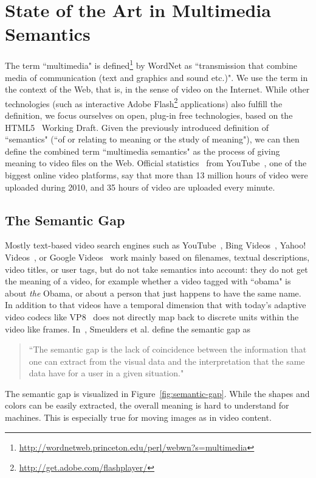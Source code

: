\documentclass[12pt]{article}
\begin{document}
\section{State of the Art in Multimedia Semantics}
The term ``multimedia" is defined\footnote{\url{http://wordnetweb.princeton.edu/perl/webwn?s=multimedia}} by WordNet as ``transmission that combine media of communication (text and graphics and sound etc.)". We use the term in the context of the Web, that is, in the sense of video on the Internet. While other technologies (such as interactive Adobe Flash\footnote{\url{http://get.adobe.com/flashplayer/}} applications) also fulfill the definition, we focus ourselves on open, plug-in free technologies, based on the HTML5~\cite{w3c_html5} Working Draft. Given the previously introduced definition of ``semantics" (``of or relating to meaning or the study of meaning"), we can then define the combined term ``multimedia semantics" as the process of giving meaning to video files on the Web. Official statistics~\cite{youtube:stats} from YouTube~\cite{youtube}, one of the biggest online video platforms, say that more than 13 million hours of video were uploaded during 2010, and 35 hours of video are uploaded every minute.

\subsection{The Semantic Gap}
Mostly text-based video search engines such as YouTube~\cite{youtube}, Bing Videos~\cite{bing}, Yahoo! Videos~\cite{yahoo}, or Google Videos~\cite{google} work mainly based on filenames, textual descriptions, video titles, or user tags, but do not take semantics into account: they do not get the meaning of a video, for example whether a video tagged with ``obama" is about \textit{the} Obama, or about a person that just happens to have the same name. In addition to that videos have a temporal dimension that with today's adaptive video codecs like VP8~\cite{vp8} does not directly map back to discrete units within the video like frames. In~\cite{Smeulders}, Smeulders et al. define the semantic gap as
\begin{quotation}
\noindent ``The semantic gap is the lack of coincidence between the information that one can extract from the visual data and the interpretation that the same data have for a user in a given situation."
\end{quotation}

\noindent The semantic gap is visualized in Figure~\ref{fig:semantic-gap}. While the shapes and colors can be easily extracted, the overall meaning is hard to understand for machines. This is especially true for moving images as in video content.
\end{document}
